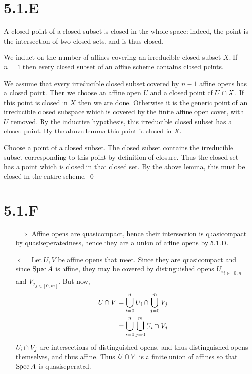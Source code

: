 \documentclass{article}
\begin{document}
\section{5.1.E}
A closed point of a closed subset is closed in the whole space: indeed, the point is the intersection of two closed sets, and is thus closed.

We induct on the number of affines covering an irreducible closed subset $X$. If $n=1$ then every closed subset of an affine scheme contains closed points.

We assume that every irreducible closed subset covered by $n-1$ affine opens has a closed point. Then we choose an affine open $U$ and a closed point of $U \cap X$. If this point is closed in $X$ then we are done. Otherwise it is the generic point of an irreducible closed subspace which is covered by the finite affine open cover, with $U$ removed. By the inductive hypothesis, this irreducible closed subset has a closed point. By the above lemma this point is closed in $X$.

Choose a point of a closed subset. The closed subset contains the irreducible subset corresponding to this point by definition of closure. Thus the closed set has a point which is closed in that closed set. By the above lemma, this must be closed in the entire scheme. \qed

\section{5.1.F}
\begin{itemize}
    \item [$\implies$] Affine opens are quasicompact, hence their intersection is quasicompact by quasiseperatedness, hence they are a union of affine opens by 5.1.D.
    \item [$\impliedby$] Let $U, V$ be affine opens that meet. Since they are quasicompact and since $\operatorname{Spec} A$ is affine, they may be covered by distinguished opens ${U_i}_{i \in [0,n]}$ and ${V_j}_{j \in [0,m]}$. But now,
          \begin{align*}
              U \cap V & = \bigcup_{i=0}^n U_i \cap \bigcup_{j=0}^m V_j \\
                             & = \bigcup_{i=0}^n \bigcup_{j=0}^m U_i \cap V_j
          \end{align*}
          $U_i \cap V_j$ are intersections of distinguished opens, and thus distinguished opens themselves, and thus affine. Thus $U \cap V$ is a finite union of affines so that $\operatorname{Spec} A$ is quasiseperated.
\end{itemize}
\end{document}
